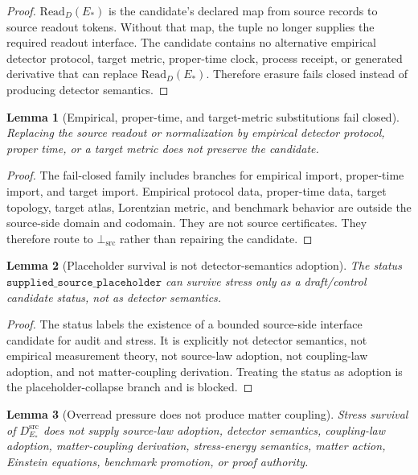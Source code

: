 \documentclass[11pt]{article}
\newcommand{\DSrc}{D^{\mathrm{src}}_{E_{\ast}}}
\newcommand{\ReadD}{\mathrm{Read}_{D}(E_{\ast})}
\newcommand{\BottomSrc}{\bot_{\mathrm{src}}}
\newtheorem{lemma}{Lemma}
\begin{document}
\begin{proof}
\(\ReadD\) is the candidate's declared map from source records to source
readout tokens. Without that map, the tuple no longer supplies the required
readout interface. The candidate contains no alternative empirical detector
protocol, target metric, proper-time clock, process receipt, or generated
derivative that can replace \(\ReadD\). Therefore erasure fails closed instead
of producing detector semantics.
\end{proof}

\begin{lemma}[Empirical, proper-time, and target-metric substitutions fail closed]
Replacing the source readout or normalization by empirical detector protocol,
proper time, or a target metric does not preserve the candidate.
\end{lemma}

\begin{proof}
The fail-closed family includes branches for empirical import, proper-time
import, and target import. Empirical protocol data, proper-time data, target
topology, target atlas, Lorentzian metric, and benchmark behavior are outside
the source-side domain and codomain. They are not source certificates. They
therefore route to \(\BottomSrc\) rather than repairing the candidate.
\end{proof}

\begin{lemma}[Placeholder survival is not detector-semantics adoption]
The status \(\texttt{supplied\_source\_placeholder}\) can survive stress only
as a draft/control candidate status, not as detector semantics.
\end{lemma}

\begin{proof}
The status labels the existence of a bounded source-side interface candidate
for audit and stress. It is explicitly not detector semantics, not empirical
measurement theory, not source-law adoption, not coupling-law adoption, and
not matter-coupling derivation. Treating the status as adoption is the
placeholder-collapse branch and is blocked.
\end{proof}

\begin{lemma}[Overread pressure does not produce matter coupling]
Stress survival of \(\DSrc\) does not supply source-law adoption, detector
semantics, coupling-law adoption, matter-coupling derivation, stress-energy
semantics, matter action, Einstein equations, benchmark promotion, or proof
authority.
\end{lemma}
\end{document}
